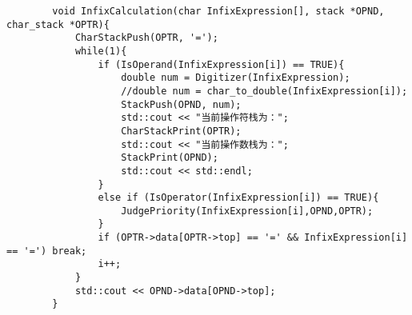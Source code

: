 \documentclass[10pt,a4paper]{article}
\begin{document}
\begin{verbatim}
		
		
		
		void InfixCalculation(char InfixExpression[], stack *OPND, char_stack *OPTR){
			CharStackPush(OPTR, '=');
			while(1){
				if (IsOperand(InfixExpression[i]) == TRUE){
					double num = Digitizer(InfixExpression);
					//double num = char_to_double(InfixExpression[i]);
					StackPush(OPND, num);
					std::cout << "当前操作符栈为：";
					CharStackPrint(OPTR);
					std::cout << "当前操作数栈为：";
					StackPrint(OPND);
					std::cout << std::endl;
				}
				else if (IsOperator(InfixExpression[i]) == TRUE){
					JudgePriority(InfixExpression[i],OPND,OPTR);
				}
				if (OPTR->data[OPTR->top] == '=' && InfixExpression[i] == '=') break;
				i++;
			}
			std::cout << OPND->data[OPND->top];
		}
	\end{verbatim}
\end{document}
